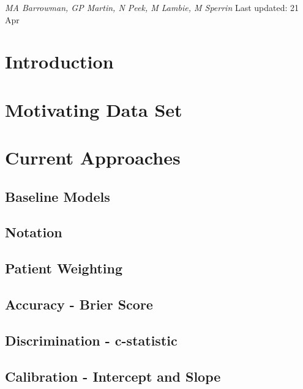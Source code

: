 \documentclass[12pt,PhD,twoside,openright]{muthesis}
\begin{document}
\emph{MA Barrowman, GP Martin, N Peek, M Lambie, M Sperrin}
Last updated: 21 Apr

\hypertarget{introduction-5}{%
\section{Introduction}\label{introduction-5}}

\hypertarget{motivating-data-set}{%
\section{Motivating Data Set}\label{motivating-data-set}}

\hypertarget{current-approaches}{%
\section{Current Approaches}\label{current-approaches}}

\hypertarget{baseline-models}{%
\subsection{Baseline Models}\label{baseline-models}}

\hypertarget{notation}{%
\subsection{Notation}\label{notation}}

\hypertarget{patient-weighting}{%
\subsection{Patient Weighting}\label{patient-weighting}}

\hypertarget{accuracy---brier-score}{%
\subsection{Accuracy - Brier Score}\label{accuracy---brier-score}}

\hypertarget{discrimination---c-statistic}{%
\subsection{Discrimination - c-statistic}\label{discrimination---c-statistic}}

\hypertarget{calibration---intercept-and-slope}{%
\subsection{Calibration - Intercept and Slope}\label{calibration---intercept-and-slope}}
\end{document}
